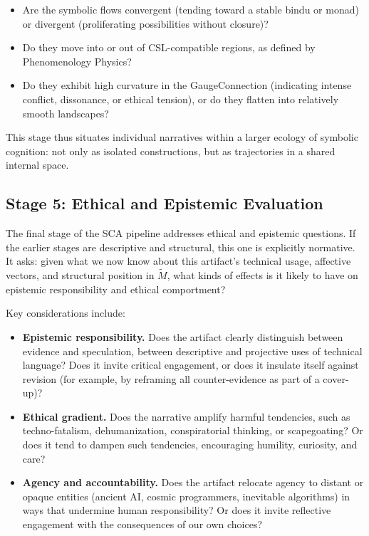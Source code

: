 \documentclass[12]{amsart}
\theoremstyle{plain}
\begin{document}
\begin{itemize}
  \item Are the symbolic flows convergent (tending toward a stable bindu or monad) or divergent (proliferating possibilities without closure)?
  \item Do they move into or out of CSL-compatible regions, as defined by Phenomenology Physics?
  \item Do they exhibit high curvature in the GaugeConnection (indicating intense conflict, dissonance, or ethical tension), or do they flatten into relatively smooth landscapes?
\end{itemize}

This stage thus situates individual narratives within a larger ecology of symbolic cognition: not only as isolated constructions, but as trajectories in a shared internal space.

\subsection{Stage 5: Ethical and Epistemic Evaluation}

The final stage of the SCA pipeline addresses ethical and epistemic questions. If the earlier stages are descriptive and structural, this one is explicitly normative. It asks: given what we now know about this artifact's technical usage, affective vectors, and structural position in $\tilde M$, what kinds of effects is it likely to have on epistemic responsibility and ethical comportment?

Key considerations include:

\begin{itemize}
  \item \textbf{Epistemic responsibility.} Does the artifact clearly distinguish between evidence and speculation, between descriptive and projective uses of technical language? Does it invite critical engagement, or does it insulate itself against revision (for example, by reframing all counter-evidence as part of a cover-up)?
  \item \textbf{Ethical gradient.} Does the narrative amplify harmful tendencies, such as techno-fatalism, dehumanization, conspiratorial thinking, or scapegoating? Or does it tend to dampen such tendencies, encouraging humility, curiosity, and care?
  \item \textbf{Agency and accountability.} Does the artifact relocate agency to distant or opaque entities (ancient AI, cosmic programmers, inevitable algorithms) in ways that undermine human responsibility? Or does it invite reflective engagement with the consequences of our own choices?
\end{itemize}
\end{document}

